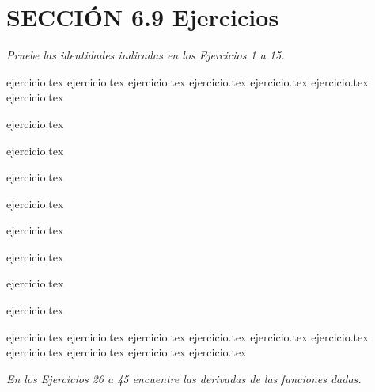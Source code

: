 
\section*{SECCIÓN 6.9 \quad Ejercicios}

\noindent \textit{Pruebe las identidades indicadas en los Ejercicios 1 a 15.}

\begin{enumerate}
    \begin{minipage}{0.45\textwidth}
    {ejercicio.tex}
{ejercicio.tex}
{ejercicio.tex}
{ejercicio.tex}
{ejercicio.tex}
{ejercicio.tex}
{ejercicio.tex}
\end{minipage}%
    \begin{minipage}{0.45\textwidth}
    \setcounter{enumi}{7}
    {ejercicio.tex}
\addtocounter{enumi}{1}
    {ejercicio.tex}
\addtocounter{enumi}{1}
    {ejercicio.tex}
\addtocounter{enumi}{1}
    {ejercicio.tex}
\addtocounter{enumi}{1}
    {ejercicio.tex}
\addtocounter{enumi}{1}
    {ejercicio.tex}
\addtocounter{enumi}{1}
    {ejercicio.tex}
\addtocounter{enumi}{1}
    {ejercicio.tex}
\end{minipage}
\end{enumerate}

\vspace{1em}
\begin{enumerate}
    \setcounter{enumi}{15}
    {ejercicio.tex}
{ejercicio.tex}
{ejercicio.tex}
{ejercicio.tex}
{ejercicio.tex}
{ejercicio.tex}
{ejercicio.tex}
{ejercicio.tex}
{ejercicio.tex}
{ejercicio.tex}
\end{enumerate}

\vspace{1em}
\noindent \textit{En los Ejercicios 26 a 45 encuentre las derivadas de las funciones dadas.}


